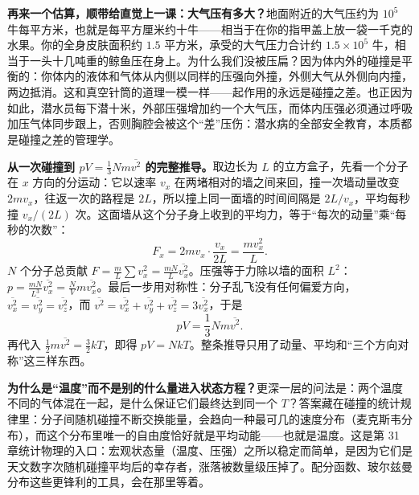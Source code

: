 \textbf{再来一个估算，顺带给直觉上一课：大气压有多大？}地面附近的大气压约为 \(10^5\) 牛每平方米，也就是每平方厘米约十牛——相当于在你的指甲盖上放一袋一千克的水果。你的全身皮肤面积约 \(1.5\) 平方米，承受的大气压力合计约 \(1.5\times10^5\) 牛，相当于一头十几吨重的鲸鱼压在身上。为什么我们没被压扁？因为体内外的碰撞是平衡的：你体内的液体和气体从内侧以同样的压强向外撞，外侧大气从外侧向内撞，两边抵消。这和真空针筒的道理一模一样——起作用的永远是碰撞之差。也正因为如此，潜水员每下潜十米，外部压强增加约一个大气压，而体内压强必须通过呼吸加压气体同步跟上，否则胸腔会被这个“差”压伤：潜水病的全部安全教育，本质都是碰撞之差的管理学。

\begin{center}
\end{center}

\begin{mathbridge}
\textbf{从一次碰撞到 \(pV=\frac{1}{3}Nm\overline{v^2}\) 的完整推导。}取边长为 \(L\) 的立方盒子，先看一个分子在 \(x\) 方向的分运动：它以速率 \(v_x\) 在两堵相对的墙之间来回，撞一次墙动量改变 \(2mv_x\)，往返一次的路程是 \(2L\)，所以撞上同一面墙的时间间隔是 \(2L/v_x\)，平均每秒撞 \(v_x/(2L)\) 次。这面墙从这个分子身上收到的平均力，等于“每次的动量”乘“每秒的次数”：
\[
F_x = 2mv_x \cdot \frac{v_x}{2L} = \frac{mv_x^2}{L}.
\]
\(N\) 个分子总贡献 \(F = \frac{m}{L}\sum v_x^2 = \frac{mN}{L}\overline{v_x^2}\)。压强等于力除以墙的面积 \(L^2\)：\(p = \frac{mN}{L^3}\overline{v_x^2} = \frac{N}{V}m\overline{v_x^2}\)。最后一步用对称性：分子乱飞没有任何偏爱方向，\(\overline{v_x^2}=\overline{v_y^2}=\overline{v_z^2}\)，而 \(\overline{v^2}=\overline{v_x^2}+\overline{v_y^2}+\overline{v_z^2}=3\overline{v_x^2}\)，于是
\[
pV = \frac{1}{3}Nm\overline{v^2}.
\]
再代入 \(\frac{1}{2}m\overline{v^2}=\frac{3}{2}kT\)，即得 \(pV=NkT\)。整条推导只用了动量、平均和“三个方向对称”这三样东西。
\end{mathbridge}

\begin{challenge}
\textbf{为什么是“温度”而不是别的什么量进入状态方程？}更深一层的问法是：两个温度不同的气体混在一起，是什么保证它们最终达到同一个 \(T\)？答案藏在碰撞的统计规律里：分子间随机碰撞不断交换能量，会趋向一种最可几的速度分布（麦克斯韦分布），而这个分布里唯一的自由度恰好就是平均动能——也就是温度。这是第 31 章统计物理的入口：宏观状态量（温度、压强）之所以稳定而简单，是因为它们是天文数字次随机碰撞平均后的幸存者，涨落被数量级压掉了。配分函数、玻尔兹曼分布这些更锋利的工具，会在那里等着。
\end{challenge}

